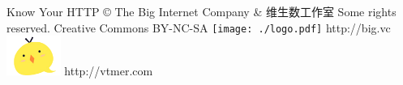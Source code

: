 \usepackage{cclicenses}

\beamertemplatenavigationsymbolsempty

{%
\begin{beamercolorbox}{}
    \hspace{25pt} \normalsize Know Your HTTP  \copyright \hspace{0in} The Big Internet Company \& 维生数工作室  Some rights reserved.
    \cc \hspace{-0.1in} Creative Commons BY-NC-SA
    \hfill \Huge \texttt{[image: ./logo.pdf]} \normalsize
    \hspace{5pt}http://big.vc
    \hfill \Huge \includegraphics[width=50pt]{vtmer-logo.png} \normalsize
    \hspace{5pt}http://vtmer.com
    \vspace{8pt}
\end{beamercolorbox}%
}

